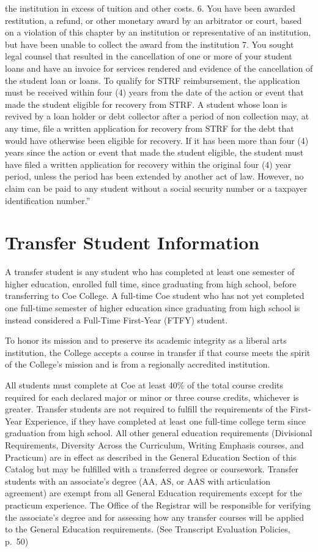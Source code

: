 \documentclass[
  letterpaper,
]{scrbook}
\begin{document}
the institution in excess of tuition and other costs. 6. You have been
awarded restitution, a refund, or other monetary award by an arbitrator
or court, based on a violation of this chapter by an institution or
representative of an institution, but have been unable to collect the
award from the institution 7. You sought legal counsel that resulted in
the cancellation of one or more of your student loans and have an
invoice for services rendered and evidence of the cancellation of the
student loan or loans. To qualify for STRF reimbursement, the
application must be received within four (4) years from the date of the
action or event that made the student eligible for recovery from STRF. A
student whose loan is revived by a loan holder or debt collector after a
period of non collection may, at any time, file a written application
for recovery from STRF for the debt that would have otherwise been
eligible for recovery. If it has been more than four (4) years since the
action or event that made the student eligible, the student must have
filed a written application for recovery within the original four (4)
year period, unless the period has been extended by another act of law.
However, no claim can be paid to any student without a social security
number or a taxpayer identification number.''

\section{Transfer Student
Information}\label{transfer-student-information}

A transfer student is any student who has completed at least one
semester of higher education, enrolled full time, since graduating from
high school, before transferring to Coe College. A full-time Coe student
who has not yet completed one full-time semester of higher education
since graduating from high school is instead considered a Full-Time
First-Year (FTFY) student.

To honor its mission and to preserve its academic integrity as a liberal
arts institution, the College accepts a course in transfer if that
course meets the spirit of the College's mission and is from a
regionally accredited institution.

All students must complete at Coe at least 40\% of the total course
credits required for each declared major or minor or three course
credits, whichever is greater. Transfer students are not required to
fulfill the requirements of the First-Year Experience, if they have
completed at least one full-time college term since graduation from high
school. All other general education requirements (Divisional
Requirements, Diversity Across the Curriculum, Writing Emphasis courses,
and Practicum) are in effect as described in the General Education
Section of this Catalog but may be fulfilled with a transferred degree
or coursework. Transfer students with an associate's degree (AA, AS, or
AAS with articulation agreement) are exempt from all General Education
requirements except for the practicum experience. The Office of the
Registrar will be responsible for verifying the associate's degree and
for assessing how any transfer courses will be applied to the General
Education requirements. (See Transcript Evaluation Policies, p.~50)
\end{document}
